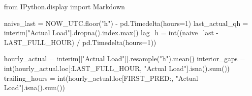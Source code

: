 \documentclass[
  english,
  letterpaper,
]{scrbook}
\newenvironment{Shaded}{\begin{snugshade}}{\end{snugshade}}
\newcommand{\BuiltInTok}[1]{\textcolor[rgb]{0.00,0.23,0.31}{#1}}
\newcommand{\DecValTok}[1]{\textcolor[rgb]{0.68,0.00,0.00}{#1}}
\newcommand{\ImportTok}[1]{\textcolor[rgb]{0.00,0.46,0.62}{#1}}
\newcommand{\NormalTok}[1]{\textcolor[rgb]{0.00,0.23,0.31}{#1}}
\newcommand{\OperatorTok}[1]{\textcolor[rgb]{0.37,0.37,0.37}{#1}}
\newcommand{\StringTok}[1]{\textcolor[rgb]{0.13,0.47,0.30}{#1}}
\begin{document}
\begin{Shaded}
\begin{Highlighting}[]
\ImportTok{from}\NormalTok{ IPython.display }\ImportTok{import}\NormalTok{ Markdown}

\NormalTok{naive\_last }\OperatorTok{=}\NormalTok{ NOW\_UTC.floor(}\StringTok{"h"}\NormalTok{) }\OperatorTok{{-}}\NormalTok{ pd.Timedelta(hours}\OperatorTok{=}\DecValTok{1}\NormalTok{)}
\NormalTok{last\_actual\_qh }\OperatorTok{=}\NormalTok{ interim[}\StringTok{"Actual Load"}\NormalTok{].dropna().index.}\BuiltInTok{max}\NormalTok{()}
\NormalTok{lag\_h }\OperatorTok{=} \BuiltInTok{int}\NormalTok{((naive\_last }\OperatorTok{{-}}\NormalTok{ LAST\_FULL\_HOUR) }\OperatorTok{/}\NormalTok{ pd.Timedelta(hours}\OperatorTok{=}\DecValTok{1}\NormalTok{))}

\NormalTok{hourly\_actual }\OperatorTok{=}\NormalTok{ interim[[}\StringTok{"Actual Load"}\NormalTok{]].resample(}\StringTok{"h"}\NormalTok{).mean()}
\NormalTok{interior\_gaps }\OperatorTok{=} \BuiltInTok{int}\NormalTok{(hourly\_actual.loc[:LAST\_FULL\_HOUR, }\StringTok{"Actual Load"}\NormalTok{].isna().}\BuiltInTok{sum}\NormalTok{())}
\NormalTok{trailing\_hours }\OperatorTok{=} \BuiltInTok{int}\NormalTok{(hourly\_actual.loc[FIRST\_PRED:, }\StringTok{"Actual Load"}\NormalTok{].isna().}\BuiltInTok{sum}\NormalTok{())}


\end{Highlighting}
\end{Shaded}
\end{document}

